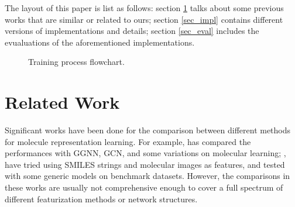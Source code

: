 \documentclass[conference]{IEEEtran}
\begin{document}
The layout of this paper is list as follows: 
section \ref{sec_rw} talks about some previous works that are similar or related to ours; 
section \ref{sec_impl} contains different versions of implementations and details; 
section \ref{sec_eval} includes the evualuations of the aforementioned implementations. 

\begin{figure}[!htb] 

	\caption{\small 
		Training process flowchart. }
	\label{fig:train}
\end{figure}

\section{Related Work} \label{sec_rw}

Significant works have been done for the comparison between different methods for molecule representation learning. 
For example, \cite{gagcn} has compared the performances with GGNN, GCN, and some variations on molecular learning; \cite{smiles2vec}, \cite{chemception} have tried using SMILES strings and molecular images as features, and tested with some generic models on benchmark datasets. 
However, the comparisons in these works are usually not comprehensive enough to cover a full spectrum of different featurization methods or network structures. 
\end{document}
